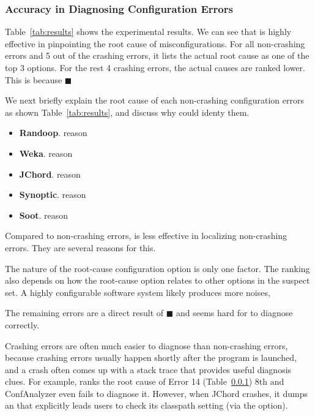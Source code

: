 \subsubsection{Accuracy in Diagnosing Configuration Errors}

Table~\ref{tab:results} shows the experimental results.
We can see that \ourtool is highly effective in pinpointing the root cause of
misconfigurations. For all \noncrash non-crashing errors
and 5 out of the \crash crashing errors, it lists the actual root cause as one of the
top 3 options. For the rest
4 crashing errors, the actual causes are ranked lower.
This is because $\blacksquare$


We next briefly explain the root cause of each non-crashing configuration
errors as shown Table~\ref{tab:results}, and discuss why
\ourtool could identy them. 

\begin{itemize}
\item \textbf{Randoop}. reason
\item \textbf{Weka}. reason
\item \textbf{JChord}. reason
\item \textbf{Synoptic}. reason
\item \textbf{Soot}. reason
\end{itemize}

Compared to non-crashing errors, \ourtool is less effective
in localizing non-crashing errors. They are several reasons
for this.

The nature of the root-cause configuration option is only one factor.
The ranking also depends on how the root-cause option relates to
other options in the suspect set. A highly configurable software system 
likely produces more noises, 


The remaining errors are a direct result of $\blacksquare$ and seems
hard for \ourtool to diagnose correctly.



Crashing errors are often much easier to diagnose than non-crashing errors,
because crashing errors usually happen shortly after the program
is launched, and a crash often comes up with a stack trace that provides
useful diagnosis clues. For example, \ourtool ranks the root cause of
Error 14 (Table~\ref{}) 8th and ConfAnalyzer even fails to diagnose it.
However, when JChord crashes, it dumps an 
that explicitly leads users to check its classpath setting (via the
 option).


